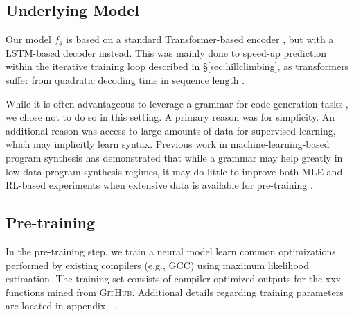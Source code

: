 \documentclass{article}
\begin{document}
\subsection{Underlying Model}


Our model $f_{\theta}$ is based on a standard Transformer-based encoder \citep{vaswani2017attention}, but with a LSTM-based decoder \citep{hochreiter1997long,chen-etal-2018-best} instead.
This was mainly done to speed-up prediction within the iterative training loop described in \S\ref{sec:hillclimbing}, as transformers suffer from quadratic decoding time in sequence length \citep{chen-etal-2018-best}.
 

 
While it is often advantageous to leverage a grammar for code generation tasks \citep{parisotto2016neuro,yin-neubig-2017-syntactic}, we chose not to do so in this setting. A primary reason was for simplicity. An additional reason was access to large amounts of data for supervised learning, which may implicitly learn syntax. Previous work in machine-learning-based program synthesis has demonstrated that while a grammar may help greatly in low-data program synthesis regimes, it may do little to improve both MLE and RL-based experiments when extensive data is available for pre-training \cite{bunel2018leveraging}.

\subsection{Pre-training}
In the pre-training step, we train a neural model learn common optimizations performed by existing compilers (e.g., GCC) using maximum likelihood estimation. 
The training set consists of compiler-optimized outputs for the xxx  functions mined from \textsc{GitHub}.
Additional details regarding training parameters are located in appendix - . 
\end{document}
